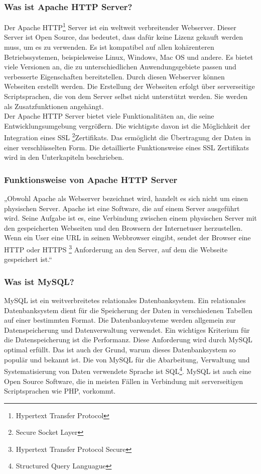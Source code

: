 \subsubsection{Was ist Apache HTTP Server?} 
Der Apache HTTP\footnote{Hypertext Transfer Protocol} Server ist ein weltweit verbreitender Webserver. Dieser Server ist Open Source, das bedeutet, dass dafür keine Lizenz gekauft werden muss, um es zu verwenden. Es ist kompatibel auf allen kohärenteren Betriebssystemen, beispielsweise Linux, Windows, Mac OS und andere. Es bietet viele Versionen an, die zu unterschiedlichen Anwendungsgebiete passen und verbesserte Eigenschaften bereitstellen. Durch diesen Webserver können Webseiten erstellt werden. Die Erstellung der Webseiten erfolgt über serverseitige Scriptsprachen, die von dem Server selbst nicht unterstützt werden. Sie werden als Zusatzfunktionen angehängt. \\
Der Apache HTTP Server bietet viele Funktionalitäten an, die seine Entwicklungsumgebung vergrößern. Die wichtigste davon ist die Möglichkeit der Integration eines SSL \footnote{Secure Socket Layer}Zertifikats. Das ermöglicht die Übertragung der Daten in einer verschlüsselten Form. Die detaillierte Funktionsweise eines SSL Zertifikats wird in den Unterkapiteln beschrieben.  \cite{50_apache}
\subsubsection{Funktionsweise von Apache HTTP Server} 
„Obwohl Apache als Webserver bezeichnet wird, handelt es sich nicht um einen physischen Server. Apache ist eine Software, die auf einem Server ausgeführt wird. Seine Aufgabe ist es, eine Verbindung zwischen einem physischen Server mit den gespeicherten Webseiten und den Browsern der Internetuser herzustellen. \\
Wenn ein User eine URL in seinen Webbrowser eingibt, sendet der Browser eine HTTP oder HTTPS \footnote{Hypertext Transfer Protocol Secure} Anforderung an den Server, auf dem die Webseite gespeichert ist.“ \cite{50_apache} \\

\subsubsection{Was ist MySQL?} 
MySQL ist ein weitverbreitetes relationales Datenbanksystem. Ein relationales Datenbanksystem dient für die Speicherung der Daten in verschiedenen Tabellen auf einer bestimmten Format. Die Datenbanksysteme werden allgemein zur Datenspeicherung und Datenverwaltung verwendet. Ein wichtiges Kriterium für die Datenspeicherung ist die Performanz. Diese Anforderung wird durch MySQL optimal erfüllt. Das ist auch der Grund, warum dieses Datenbanksystem so populär und bekannt ist. Die von MySQL für die Abarbeitung, Verwaltung und Systematisierung von Daten verwendete Sprache ist SQL\footnote{Structured Query Languague}. MySQL ist auch eine Open Source Software,
die in meisten Fällen in Verbindung mit serverseitigen Scriptsprachen wie PHP, vorkommt. \cite{50_mysql}
